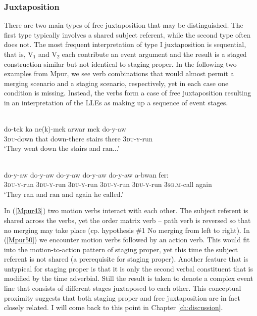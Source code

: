 {\subsubsection{Juxtaposition}
\label{sec:juxtaposition}

There are two main types of free juxtaposition that may be distinguished. The first type typically involves a shared subject referent, while the second type often does not. The most frequent interpretation of type I juxtaposition is sequential, that is, V$_1$ and V$_2$ each contribute an event argument and the result is a staged construction similar but not identical to staging proper. In the following two examples from Mpur, we see verb combinations that would almost permit a merging scenario and a staging scenario, respectively, yet in each case one condition is missing. Instead, the verbs form a case of free juxtaposition resulting in an interpretation of the LLEs as making up a sequence of event stages.

\ea \label{Mpur43} 
\\
\gll do-tek ka ne(k)-mek arwar mek do-y-aw \\
3\textsc{du}-down that down-there stairs there 3\textsc{du}-\textsc{y}-run \\
\glft `They went down the stairs and ran...' \\ 
\z

\xe
\ea \label{Mpur50}
\\
\gll do-y-aw do-y-aw do-y-aw do-y-aw do-y-aw a-bwan fer: \\
3\textsc{du}-\textsc{y}-run 3\textsc{du}-\textsc{y}-run 3\textsc{du}-\textsc{y}-run 3\textsc{du}-\textsc{y}-run 3\textsc{du}-\textsc{y}-run 3\textsc{sg}.\textsc{m}-call again \\
\glft `They ran and ran and again he called.' \\ 
\z

In (\ref{Mpur43}) two motion verbs interact with each other. The subject referent is shared across the verbs, yet the order matrix verb -- path verb is reversed so that no merging may take place (cp. hypothesis \#1 No merging from left to right). In (\ref{Mpur50}) we encounter motion verbs followed by an action verb. This would fit into the motion-to-action pattern of staging proper, yet this time the subject referent is not shared (a prerequisite for staging proper). Another feature that is untypical for staging proper is that it is only the second verbal constituent that is modified by the time adverbial. Still the result is taken to denote a complex event line that consists of different stages juxtaposed to each other. This conceptual proximity suggests that both staging proper and free juxtaposition are in fact closely related. I will come back to this point in Chapter \ref{ch:discussion}.

}

